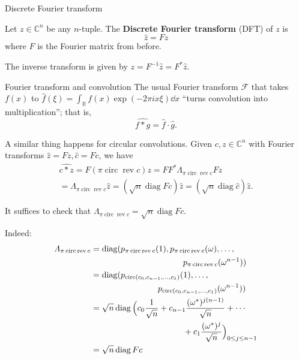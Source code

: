 \documentclass[mathserif
, handout
]{beamer}
\DeclareMathOperator{\Circ}{circ}
\DeclareMathOperator{\diag}{diag}
\DeclareMathOperator{\rev}{rev}
\begin{document}
\begin{frame}{Discrete Fourier transform}    
    \begin{definition}
        Let $z \in \mathbb C^n$ be any $n$-tuple. The \textbf{Discrete Fourier transform} (DFT) of $z$ is 
    \[\hat z = Fz\] where $F$ is the Fourier matrix from before.
    \end{definition} The inverse transform is given by $z = F^{-1}\hat z = F^\ast\hat z$.
\end{frame}

\begin{frame}{Fourier transform and convolution}
    The usual Fourier transform $\mathcal F$ that takes $f(x)$ to $\hat f(\xi) = \int_\mathbb R f(x)\exp(-2\pi i x \xi)\dd x$ ``turns convolution into multiplication''; that is,
    \[\widehat{f\ast g} = \hat f\cdot \hat g.\]
    
    A similar thing happens for circular convolutions. Given $c,z\in\mathbb C^n$ with Fourier transforms $\hat z = Fz, \hat c = Fc$, we have
    \begin{multline*}
        \widehat{c\ast z} = F(\pi \Circ \rev c)z = FF^\ast\varLambda_{\pi \Circ \rev c}Fz \\ = \varLambda_{\pi \Circ \rev c}\hat z=(\sqrt{n}\diag F c)\hat z = (\sqrt{n}\diag \hat c)\hat z.
    \end{multline*}
\end{frame}

\begin{frame}{}
    It suffices to check that $\varLambda_{\pi \Circ \rev c} = \sqrt{n}\diag F c$.
    \begin{block}{Indeed:}\vspace*{-1.5em}
        \begin{align*}
            \varLambda_{\pi \Circ \rev c} &= \diag(p_{\pi \Circ \rev c}(1),p_{\pi \Circ \rev c}(\omega),\dots,\\
            &\hspace*{11em}p_{\pi \Circ \rev c}(\omega^{n-1}))\\
            &= \diag(p_{\Circ(c_0,c_{n-1},\dots,c_1)}(1),\dots,\\
            &\hspace*{8em}p_{\Circ(c_0,c_{n-1},\dots,c_1)}(\omega^{n-1}))\\
            &= \sqrt{n}\diag\Big(c_0\frac{1}{\sqrt{n}}+c_{n-1}\frac{(\omega^\ast)^{j(n-1)}}{\sqrt{n}}+\cdots\\
            &\hspace*{11em} +c_1\frac{(\omega^\ast)^j}{\sqrt{n}}\Big)_{0\leq j \leq n-1}\\
            &= \sqrt{n}\diag Fc
        \end{align*}
    \end{block}
\end{frame}
\end{document}

